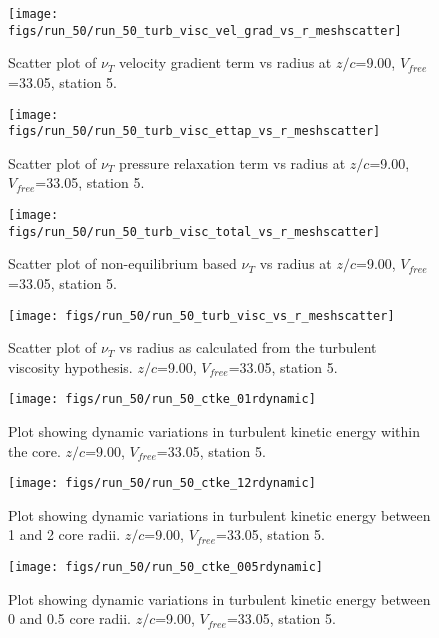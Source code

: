 \begin{figure}[H]
\centering
\texttt{[image: figs/run\_50/run\_50\_turb\_visc\_vel\_grad\_vs\_r\_meshscatter]}
\caption{Scatter plot of $\nu_T$ velocity gradient term vs radius at $z/c$=9.00, $V_{free}$=33.05, station 5.}
\end{figure}


\begin{figure}[H]
\centering
\texttt{[image: figs/run\_50/run\_50\_turb\_visc\_ettap\_vs\_r\_meshscatter]}
\caption{Scatter plot of $\nu_T$ pressure relaxation term vs radius at $z/c$=9.00, $V_{free}$=33.05, station 5.}
\end{figure}


\begin{figure}[H]
\centering
\texttt{[image: figs/run\_50/run\_50\_turb\_visc\_total\_vs\_r\_meshscatter]}
\caption{Scatter plot of non-equilibrium based $\nu_T$ vs radius at $z/c$=9.00, $V_{free}$=33.05, station 5.}
\end{figure}


\begin{figure}[H]
\centering
\texttt{[image: figs/run\_50/run\_50\_turb\_visc\_vs\_r\_meshscatter]}
\caption{Scatter plot of $\nu_T$ vs radius as calculated from the turbulent viscosity hypothesis. $z/c$=9.00, $V_{free}$=33.05, station 5.}
\end{figure}


\begin{figure}[H]
\centering
\texttt{[image: figs/run\_50/run\_50\_ctke\_01rdynamic]}
\caption{Plot showing dynamic variations in turbulent kinetic energy within the core. $z/c$=9.00, $V_{free}$=33.05, station 5.}
\end{figure}


\begin{figure}[H]
\centering
\texttt{[image: figs/run\_50/run\_50\_ctke\_12rdynamic]}
\caption{Plot showing dynamic variations in turbulent kinetic energy between 1 and 2 core radii. $z/c$=9.00, $V_{free}$=33.05, station 5.}
\end{figure}


\begin{figure}[H]
\centering
\texttt{[image: figs/run\_50/run\_50\_ctke\_005rdynamic]}
\caption{Plot showing dynamic variations in turbulent kinetic energy between 0 and 0.5 core radii. $z/c$=9.00, $V_{free}$=33.05, station 5.}
\end{figure}


